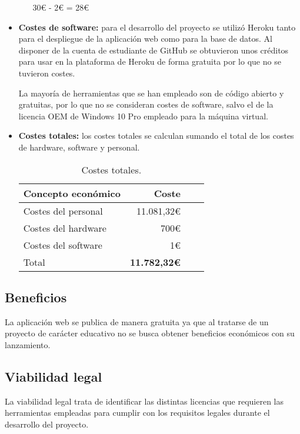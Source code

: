 \begin{itemize}
\begin{itemize}
    \begin{center}
        30€ - 2€ = 28€
    \end{center}
\end{itemize}

\item \textbf{Costes de software:} para el desarrollo del proyecto se utilizó Heroku tanto para el despliegue de la aplicación web como para la base de datos. Al disponer de la cuenta de estudiante de GitHub se obtuvieron unos créditos para usar en la plataforma de Heroku de forma gratuita por lo que no se tuvieron costes.

La mayoría de herramientas que se han empleado son de código abierto y gratuitas, por lo que no se consideran costes de software, salvo el de la licencia OEM de Windows 10 Pro empleado para la máquina virtual.

\item \textbf{Costes totales:} los costes totales se calculan sumando el total de los costes de hardware, software y personal.
    \begin{table}[h]
    \centering
    \begin{tabular}{p{6cm}rrr}
        \hline
        \textbf{Concepto económico} & \textbf{Coste} \\
        \hline
        Costes del personal & 11.081,32€ \\
        Costes del hardware & 700€ \\
        Costes del software & 1€ \\
        \hline
        Total  & {\textbf{11.782,32€}}\\
        \hline
    \end{tabular}
    \caption{Costes totales.}
    \label{tab:costes-totales}
\end{table}
\end{itemize}

\subsection{Beneficios}
La aplicación web se publica de manera gratuita ya que al tratarse de un proyecto de carácter educativo no se busca obtener beneficios económicos con su lanzamiento.

\subsection{Viabilidad legal}
La viabilidad legal trata de identificar las distintas licencias que requieren las herramientas empleadas para  cumplir con los requisitos legales durante el desarrollo del proyecto.

